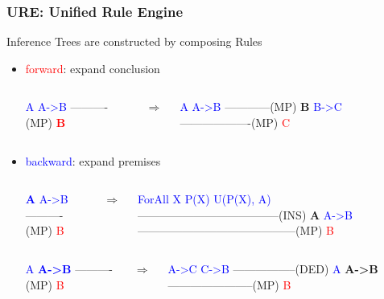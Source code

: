 \documentclass{beamer}
\begin{document}
\begin{frame}[fragile]
  \frametitle{URE: Unified Rule Engine}
  Inference Trees are constructed by composing \alert{Rules}
  \begin{itemize}
  \item<1-> \textcolor{red}{forward}: expand conclusion
    \begin{columns}
      \column{0.4in}
{\tiny \begin{semiverbatim}
\textcolor{blue}{A  A->B}
----------(MP)      
   \textcolor{red}{{\bf B}}
\end{semiverbatim}}
\column{0.1in}
$\Rightarrow$
\column{2in}
{\tiny \begin{semiverbatim}
\textcolor{blue}{A   A->B}
------------(MP)      
   {\bf B}        \textcolor{blue}{B->C}
   -------------------(MP)
          \textcolor{red}{C}
\end{semiverbatim}}
\end{columns}

\item<2-> \textcolor{blue}{backward}: expand premises
\begin{columns}
\column{0.4in}
{\tiny \begin{semiverbatim}
\textcolor{blue}{{\bf A}  A->B}
----------(MP)      
   \textcolor{red}{B}

\end{semiverbatim}}
\column{0.1in}
$\Rightarrow$
\column{2in}
{\tiny \begin{semiverbatim}
\textcolor{blue}{ForAll X P(X)  U(P(X), A)}
--------------------------------------(INS)
            {\bf A}                       \textcolor{blue}{A->B}
            ------------------------------------------(MP)
                           \textcolor{red}{B}

\end{semiverbatim}}
\end{columns}

\begin{columns}
  \column{0.4in}
{\tiny \begin{semiverbatim}
\textcolor{blue}{A  {\bf A->B}}
----------(MP)      
   \textcolor{red}{B}
\end{semiverbatim}}
\column{0.1in}
$\Rightarrow$
\column{2in}
{\tiny \begin{semiverbatim}
        \textcolor{blue}{A->C   C->B}
        -----------------(DED)
\textcolor{blue}{A}          {\bf A->B}
-----------------------(MP)
       \textcolor{red}{B}
\end{semiverbatim}}
\end{columns}

  \end{itemize}
\end{frame}
\end{document}
